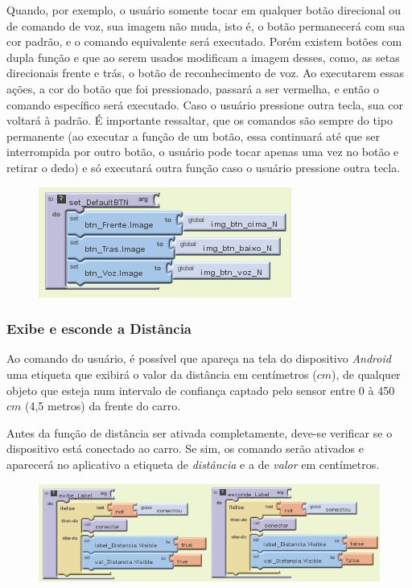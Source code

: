 \documentclass[portugues, brazil, a4paper,12pt]{article}
\begin{document}
Quando, por exemplo, o usuário somente tocar em qualquer botão direcional ou de comando de voz, sua imagem não muda, isto é, o botão permanecerá com sua cor padrão, e o comando equivalente será executado. Porém existem botões com dupla função e que ao serem usados modificam a imagem desses, como, as setas direcionais frente e trás, o botão de reconhecimento de voz. Ao executarem essas ações, a cor do botão que foi pressionado, passará a ser vermelha, e então o comando específico será executado. Caso o usuário pressione outra tecla, sua cor voltará à padrão. É importante ressaltar, que os comandos são sempre do tipo permanente (ao executar a função de um botão, essa continuará até que ser interrompida por outro botão, o usuário pode tocar apenas uma vez no botão e retirar o dedo) e só executará outra função caso o usuário pressione outra tecla.


\begin{figure}[H]
	\centering
	\includegraphics[scale=.8]{img/controle/defaultimg.png}
	
\end{figure}


\subsubsection{Exibe e esconde a Distância}
Ao comando do usuário, é possível que apareça na tela do dispositivo \textit{Android} uma etiqueta que exibirá o valor da distância em centímetros ($cm$), de qualquer objeto que esteja num intervalo de confiança captado pelo sensor entre 0 à 450 $cm$ (4,5 metros) da frente do carro.

Antes da função de distância ser ativada completamente, deve-se verificar se o dispositivo está conectado ao carro. Se sim, os comando serão ativados e aparecerá no aplicativo a etiqueta de \textit{distância} e a de \textit{valor} em centímetros.


\begin{figure}[H]
	\centering
	\includegraphics[scale=.8]{img/controle/exibeesconde.png}
	
\end{figure}
\end{document}
